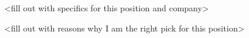 \makelettertitle

\begin{cvletter}



<fill out with specifics for this position and company>

<fill out with reasons why I am the right pick for this position>

\end{cvletter}


\makeletterclosing



